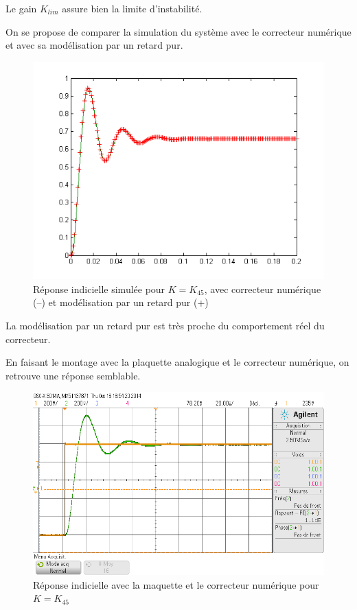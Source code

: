\documentclass[../../Cours_M1.tex]{subfiles}
\begin{document}
Le gain $K_{lim}$ assure bien la limite d'instabilité.

On se propose de comparer la simulation du système avec le correcteur numérique et avec sa modélisation par un retard pur.

\begin{figure}[h!]
\centering
\includegraphics[scale=0.8]{m3compTe1.png}
\caption{Réponse indicielle simulée pour $K=K_{45}$, avec correcteur numérique (--) et modélisation par un retard pur (+)}
\end{figure}

La modélisation par un retard pur est très proche du comportement réel du correcteur.

En faisant le montage avec la plaquette analogique et le correcteur numérique, on retrouve une réponse semblable.

\begin{figure}[h!]
\centering
\includegraphics[scale=0.5]{m3maquette.png}
\caption{Réponse indicielle avec la maquette et le correcteur numérique pour $K=K_{45}$}
\end{figure}
\end{document}
